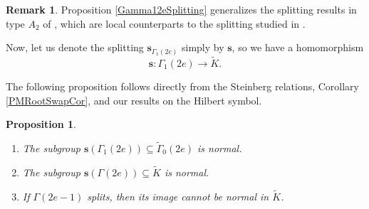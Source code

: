 \documentclass[10pt, letterpaper]{amsart}
\theoremstyle{plain}
\newtheorem{Prop}[equation]{Proposition}
\theoremstyle{definition}
\newtheorem*{Rmk}{Remark}
\numberwithin{equation}{section}
\newcommand{\Kt}{\widetilde{K}}
\newcommand{\Gammat}{\widetilde{\Gamma}}
\newcommand{\s}{\mathbf{s}}
\begin{document}
\begin{Rmk}
Proposition \ref{Gamma12eSplitting} generalizes the splitting results in type $A_2$ of \cite[Theorem 3.3]{Karasiewicz}, which are local counterparts to the splitting studied in \cite{K22}.
\end{Rmk}


Now, let us denote the splitting $\s_{\Gamma_1(2e)}$ simply by $\s$, so we have a homomorphism 
\[
\s:\Gamma_1(2e)\longrightarrow\Kt.
\]

The following proposition follows directly from the Steinberg relations, Corollary \ref{PMRootSwapCor}, and our results on the Hilbert symbol.

\begin{Prop}\label{P:SplitNormIm}$ $
    \begin{enumerate}
        \item The subgroup $\s(\Gamma_1(2e))\subseteq \Gammat_{0}(2e)$ is normal.
        \item\label{Gam2eSplitNorm} The subgroup $\s(\Gamma(2e))\subseteq \Kt$ is normal.
        \item If $\Gamma(2e-1)$ splits, then its image cannot be normal in $\Kt$.
    \end{enumerate}
\end{Prop}

\end{document}
